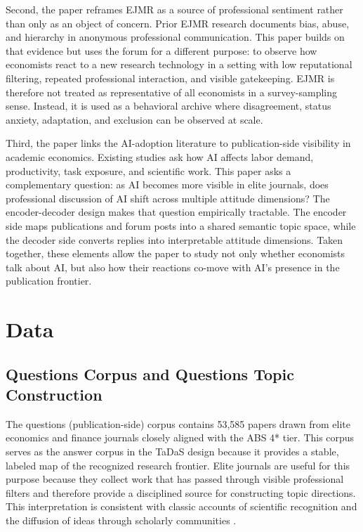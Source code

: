 \documentclass[11pt]{article}
\begin{document}
Second, the paper reframes EJMR as a source of professional sentiment rather than only as an object of concern. Prior EJMR research documents bias, abuse, and hierarchy in anonymous professional communication. This paper builds on that evidence but uses the forum for a different purpose: to observe how economists react to a new research technology in a setting with low reputational filtering, repeated professional interaction, and visible gatekeeping. EJMR is therefore not treated as representative of all economists in a survey-sampling sense. Instead, it is used as a behavioral archive where disagreement, status anxiety, adaptation, and exclusion can be observed at scale.

Third, the paper links the AI-adoption literature to publication-side visibility in academic economics. Existing studies ask how AI affects labor demand, productivity, task exposure, and scientific work. This paper asks a complementary question: as AI becomes more visible in elite journals, does professional discussion of AI shift across multiple attitude dimensions? The encoder-decoder design makes that question empirically tractable. The encoder side maps publications and forum posts into a shared semantic topic space, while the decoder side converts replies into interpretable attitude dimensions. Taken together, these elements allow the paper to study not only whether economists talk about AI, but also how their reactions co-move with AI's presence in the publication frontier.

\section{Data}
\label{sec:data}

\subsection{Questions Corpus and Questions Topic Construction}

The questions (publication-side) corpus contains 53,585 papers drawn from elite economics and finance journals closely aligned with the ABS 4* tier. This corpus serves as the answer corpus in the TaDaS design because it provides a stable, labeled map of the recognized research frontier. Elite journals are useful for this purpose because they collect work that has passed through visible professional filters and therefore provide a disciplined source for constructing topic directions. This interpretation is consistent with classic accounts of scientific recognition and the diffusion of ideas through scholarly communities \citep{merton1968,bourdieu1975,crane1972}.
\end{document}
